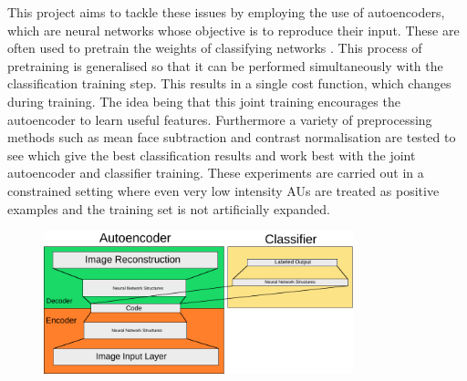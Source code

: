   This project aims to tackle these issues by employing the use of autoencoders,
  which are neural networks whose objective is to reproduce their input.
  These are often used to pretrain the weights of classifying networks \cite{googlepretrain}.
  This process of pretraining is generalised so that it can be performed simultaneously with
  the classification training step. This results in a single cost function, which changes during training.
  The idea being that this joint training
  encourages the autoencoder to learn useful features. Furthermore a variety of preprocessing methods such as mean face subtraction and contrast normalisation
  are tested to see which give the best classification results and work best with the joint
  autoencoder and classifier training. These experiments are carried out in a constrained setting
  where even very low intensity AUs are treated as positive examples and the training set is not artificially expanded.

  \begin{figure}
   \centering
   \includegraphics[width=0.8\textwidth]{illustrations/simple_network.pdf}
  \end{figure}

